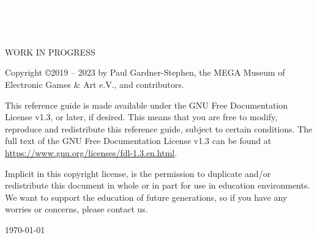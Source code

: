 





\cleardoublepage


\begin{titlepage}
    \pagecolor{blue}
     \begin{center}
       {
         \large
         \vspace*{2cm}
               {\Huge\textcolor{white}{\bf{MEGA65 REFERENCE GUIDE}}}\\
             \vspace{\fill}
                    {\textcolor{white}
                    {Published by \\ the MEGA Museum of Electronic Games \& Art e.V., Germany.}}
       }
     \end{center}
   \end{titlepage}

  \pagecolor{white}\textcolor{black}
  \vfill
  WORK IN PROGRESS

  Copyright \copyright 2019 -- 2023 by Paul Gardner-Stephen,
  the MEGA Museum of Electronic Games \& Art e.V.,
  and contributors.

  This reference guide is made available under the GNU Free Documentation
  License v1.3, or later, if desired. This means that you are free to
  modify, reproduce and redistribute this reference guide, subject to
  certain conditions. The full text of the GNU Free Documentation
  License v1.3 can be found at
  \url{https://www.gnu.org/licenses/fdl-1.3.en.html}.

  Implicit in this copyright license, is the permission to duplicate
  and/or redistribute this document in whole or in part for use in
  education environments. We want to support the education of future
  generations, so if you have any worries or concerns, please contact us.

   \par\today

